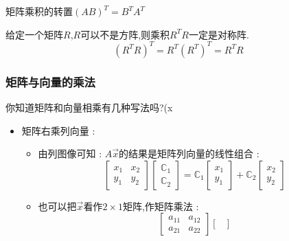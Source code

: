 \documentclass[UTF8,12pt]{ctexbook}
\newcommand{\mathConstant}{\mathbb{C}}
\newcommand{\transpose}{^T}
\begin{document}
{{{{{    矩阵乘积的转置$(AB)\transpose = B\transpose A\transpose$

    给定一个矩阵$R$,$R$可以不是方阵,则乘积$R\transpose R$一定是对称阵.
    $$
      (R\transpose R)\transpose = R\transpose(R\transpose)\transpose = R\transpose R
    $$
  }%

  \subsubsection{矩阵与向量的乘法}{
    你知道矩阵和向量相乘有几种写法吗?(x
    \begin{itemize}
      \item {
            矩阵右乘列向量 :
            \begin{itemize}
              \item {
                    由列图像可知 : $A\vec{x}$的结果是矩阵列向量的线性组合 :
                    $$
                      \begin{bmatrix}
                        x_1 & x_2 \\
                        y_1 & y_2
                      \end{bmatrix}
                      \begin{bmatrix}
                        \mathConstant_1 \\
                        \mathConstant_2
                      \end{bmatrix}
                      =
                      \mathConstant_1\begin{bmatrix}
                        x_1 \\
                        y_1
                      \end{bmatrix}
                      +
                      \mathConstant_2\begin{bmatrix}
                        x_2 \\
                        y_2
                      \end{bmatrix}
                    $$
                    }
              \item {
                    也可以把$\vec{x}$看作$2 \times 1$矩阵,作矩阵乘法 :
                    $$
                      \begin{bmatrix}
                        a_{11} & a_{12} \\
                        a_{21} & a_{22}
                      \end{bmatrix}
                      \begin{bmatrix}

\end{bmatrix}$$}
\end{itemize}}
\end{itemize}}}}}}
\end{document}
